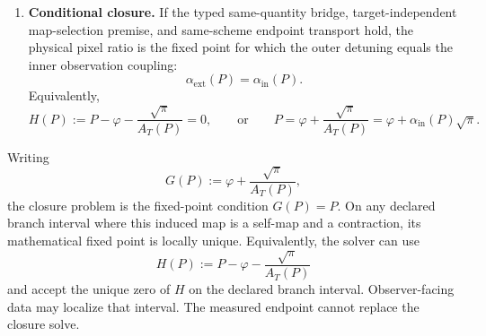 \begin{enumerate}[leftmargin=2em]
\(\alpha^{-1}(0)=137.035999177(21)\), while the separate empirical branch carries the published
hadronic compilation and returns \(136.3827548175\) on
\([136.3670480603,136.3984651934]\). For either declared branch, define
\[
A_T(P):=
T_Q\bigl(A_Z(P),F_{\mathrm{EW}}(P)\bigr)
=
\alpha_{\mathrm{Th}}^{-1}(P).
\]
The inner coupling used in the outer/inner closure is the coupling, not the inverse coupling:
\[
\alpha_{\mathrm{in}}(P):=\frac{1}{A_T(P)}.
\]
\item \textbf{Conditional closure.} If the typed same-quantity bridge, target-independent map-selection premise, and same-scheme endpoint transport hold, the physical pixel ratio is the fixed point for which the outer detuning equals the inner observation coupling:
\[
\alpha_{\mathrm{ext}}(P)=\alpha_{\mathrm{in}}(P).
\]
Equivalently,
\[
H(P):=P-\varphi-\frac{\sqrt{\pi}}{A_T(P)}=0,
\qquad\text{or}\qquad
P=\varphi+\frac{\sqrt{\pi}}{A_T(P)}=\varphi+\alpha_{\mathrm{in}}(P)\sqrt{\pi}.
\]
\end{enumerate}
Writing
\[
G(P):=\varphi+\frac{\sqrt{\pi}}{A_T(P)},
\]
the closure problem is the fixed-point condition \(G(P)=P\).
On any declared branch interval where this induced map is a self-map and a contraction, its
mathematical fixed point is locally unique.
Equivalently, the solver can use
\[
H(P):=P-\varphi-\frac{\sqrt{\pi}}{A_T(P)}
\]
and accept the unique zero of \(H\) on the declared branch interval. Observer-facing data may
localize that interval. The measured endpoint cannot replace the closure solve.

